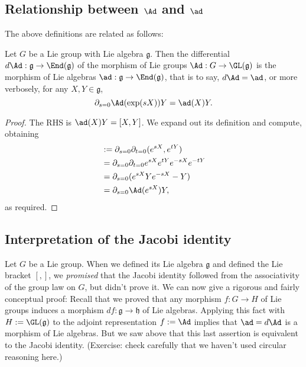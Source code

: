 \documentclass[reqno]{amsart} 
\begin{document}
\subsection{Relationship between \texorpdfstring{$\Ad$}{Ad} and \texorpdfstring{$\ad$}{ad}}
\label{sec:orgeaeefa5}
The above definitions are related as follows:
\begin{lemma}\label{lem:dAd-is-ad}
  Let $G$ be a Lie group with Lie algebra $\mathfrak{g}$.
  Then the differential $d \Ad : \mathfrak{g}
  \rightarrow \End(\mathfrak{g})$
  of the morphism of Lie groups
  $\Ad : G \rightarrow \GL(\mathfrak{g})$
  is the morphism of Lie algebras
  $\ad : \mathfrak{g} \rightarrow \End(\mathfrak{g})$,
  that is to say, $d \Ad = \ad$,
  or more verbosely,
  for any $X ,Y \in \mathfrak{g}$,
  \begin{equation*}
    \partial_{s=0}
    \Ad(\exp(s X)) Y = \ad(X) Y.
  \end{equation*}
\end{lemma}
\begin{proof}
  The RHS is $\ad(X) Y = [X,Y]$.
  We expand out its definition and compute,
  obtaining
  \begin{align*}
    [X,Y]
    &:=
      \partial_{s=0} \partial_{t=0} (e^{s X}, e^{t Y})
      \\
    &=
      \partial_{s=0} \partial_{t=0}  e^{s X} e^{t Y} e^{-s X} e^{-t Y}
      \\
    &=
      \partial_{s=0} (e^{s X} Y e^{-s X}  - Y )
      \\
    &=
      \partial_{s=0} \Ad(e^{s X}) Y,
  \end{align*}
  as required.
\end{proof}

\subsection{Interpretation of the Jacobi identity}
\label{sec:orgeedd74d}
\begin{remark}
  Let $G$ be a Lie group.
  When we defined its Lie algebra $\mathfrak{g}$
  and defined the Lie bracket $[,]$,
  we \emph{promised} that the Jacobi identity
  followed from the associativity of the group law on $G$,
  but didn't prove it.
  We can now give a rigorous and fairly conceptual proof:
  Recall that we proved
  that any morphism $f : G \rightarrow H$
  of Lie groups
  induces a morphism $d f : \mathfrak{g} \rightarrow
  \mathfrak{h}$ of Lie algebras.
  Applying this fact with $H := \GL(\mathfrak{g})$
  to the adjoint representation $f := \Ad$
  implies that $\ad = d \Ad$ is a morphism of Lie algebras.
  But we saw above that this last assertion is equivalent
  to the Jacobi identity.
  (Exercise: check carefully that we haven't used circular reasoning here.)
\end{remark}
\end{document}
